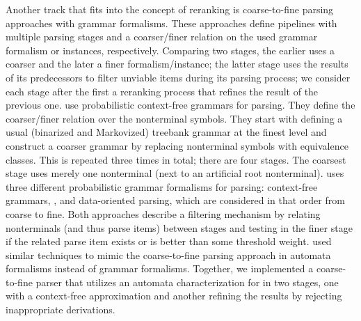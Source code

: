 \documentclass[../../document.tex]{subfiles}
\begin{document}
    Another track that fits into the concept of reranking is coarse-to-fine parsing approaches with grammar formalisms.
    These approaches define pipelines with multiple parsing stages and a coarser/finer relation on the used grammar formalism or instances, respectively.
    Comparing two stages, the earlier uses a coarser and the later a finer formalism/instance; the latter stage uses the results of its predecessors to filter unviable items during its parsing process; we consider each stage after the first a reranking process that refines the result of the previous one.
    \citet{Cha06} use probabilistic context-free grammars for parsing.
    They define the coarser/finer relation over the nonterminal symbols.
    They start with defining a usual (binarized and Markovized) treebank grammar at the finest level and construct a coarser grammar by replacing nonterminal symbols with equivalence classes.
    This is repeated three times in total; there are four stages. The coarsest stage uses merely one nonterminal (next to an artificial root nonterminal).
    \citet{CraSchBod16} uses three different probabilistic grammar formalisms for parsing: context-free grammars, , and data-oriented parsing, which are considered in that order from coarse to fine.
    Both approaches describe a filtering mechanism by relating nonterminals (and thus parse items) between stages and testing in the finer stage if the related parse item exists or is better than some threshold weight.
    \citet{Denkinger17} used similar techniques to mimic the coarse-to-fine parsing approach in automata formalisms instead of grammar formalisms.
    Together, we implemented a coarse-to-fine parser that utilizes an automata characterization for  in two stages, one with a context-free approximation and another refining the results by rejecting inappropriate derivations. \citep{RupDen19} 
    
\end{document}
